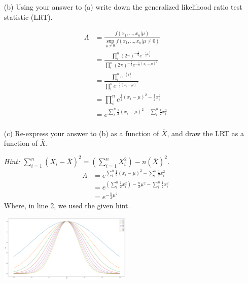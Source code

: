 \documentclass{article}
\newcommand{\1}{\mathbf{1}}
\begin{document}
\begin{itemize}
    \item[(b)]  Using your answer to (a) write down the generalized likelihood ratio test statistic (LRT).
    
    \begin{align*}
        \Lambda &= \frac{f(x_1,\hdots ,x_n|\mu)}{\sup_{\mu\neq 0} f(x_1,\hdots ,x_n|\mu\neq 0) } \\
        &= \frac{\prod_i^n  (2\pi)^{-\frac{1}{2}}e^{-\frac{1}{2}x_i^2}   }{\prod_i^n (2\pi)^{-\frac{1}{2}}e^{-\frac{1}{2}(x_i-\mu)^2} } \\
        &= \frac{\prod_i^n  e^{-\frac{1}{2}x_i^2}   }{\prod_i^n e^{-\frac{1}{2}(x_i-\mu)^2} } \\
        &= \prod_i^n  e^{\frac{1}{2}(x_i-\mu)^2 -\frac{1}{2}x_i^2}  \\
        &= e^{  \sum_i^n \frac{1}{2}(x_i-\mu)^2 -  \sum_i^n \frac{1}{2}x_i^2}  \\
    \end{align*}

    \item[(c)] Re-express your answer to (b) as a function of $\bar{X}$, and draw the LRT as a function of $\bar{X}$.\par
    {\it Hint: $\sum_{i=1}^n (X_i - \bar{X})^2  = \left(\sum_{i=1}^n X_i^2 \right) -n(\bar{X})^2$.}
    \begin{align*}
        \Lambda &= e^{  \sum_i^n \frac{1}{2}(x_i-\mu)^2 -  \sum_i^n \frac{1}{2}x_i^2}  \\
        &= e^{ \left(\sum_i^n \frac{1}{2}x_i^2\right) - \frac{n}{2}\mu^2 -  \sum_i^n \frac{1}{2}x_i^2}  \\
        &= e^{ -\frac{n}{2}\mu^2 }
    \end{align*}
    Where, in line 2, we used the given hint.
    
    \begin{center}
        \includegraphics[width=0.5\textwidth]{STATS509/HW8/HW8Figures/problem6c.png}
    \end{center}
    
    


\end{itemize}
\end{document}
